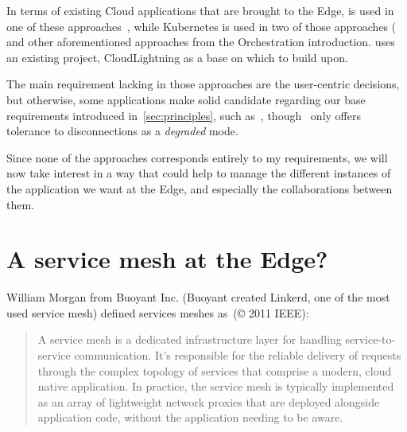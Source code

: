 In terms of existing Cloud applications that are brought to the Edge,
\os is used in one of these approaches~\cite{SYHJ17}, while Kubernetes
is used in two of those approaches (\cite{IRPCM22, openyurt} and other
aforementioned approaches from the Orchestration introduction.
%
\cite{Spataru20} uses an existing project, CloudLightning as a base on
which to build upon.

The main requirement lacking in those approaches are the user-centric
decisions, but otherwise, some applications make solid candidate
regarding our base requirements introduced
in~\autoref{sec:principles}, such as~\cite{IRPCM22, openyurt},
though~\cite{openyurt} only offers tolerance to disconnections as a
\emph{degraded} mode.


Since none of the approaches corresponds entirely to my requirements,
we will now take interest in a way that could help to manage the
different instances of the application we want at the Edge, and
especially the collaborations between them.




\section{A service mesh at the Edge?}
\label{chap:soa-SM}


William Morgan from Buoyant Inc. (Buoyant created Linkerd, one of the
most used service mesh) defined services meshes as~\cite{LLGZG19}(© 2011 IEEE):

\begin{quote}
A service mesh is a dedicated infrastructure layer for handling
service-to-service communication. It’s responsible for the reliable
delivery of requests through the complex topology of services that
comprise a modern, cloud native application. In practice, the service
mesh is typically implemented as an array of lightweight network
proxies that are deployed alongside application code, without the
application needing to be aware.
\end{quote}

